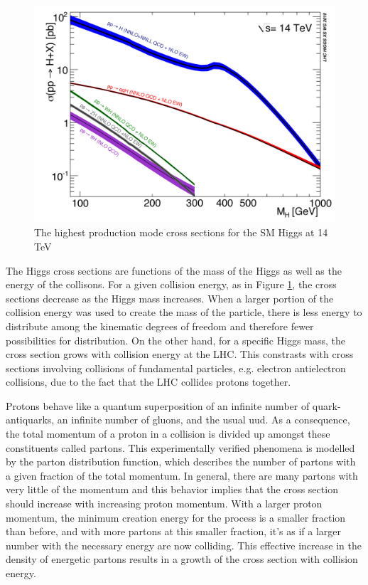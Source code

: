 \begin{figure}[h!]
  \centering
  \includegraphics[width=5in]{images/14TeV_higgs_cross_sections.png}
  \caption
   {The highest production mode cross sections for the SM Higgs at 14 TeV \cite{crossbranchplots}}
  \label{fig:hprodcross}
\end{figure}

The Higgs cross sections are functions of the mass of the Higgs as well as the energy of the collisons. For a given collision energy, as in Figure \ref{fig:hprodcross}, the cross sections decrease as the Higgs mass increases. When a larger portion of the collision energy was used to create the mass of the particle, there is less energy to distribute among the kinematic degrees of freedom and therefore fewer possibilities for distribution. On the other hand, for a specific Higgs mass, the cross section grows with collision energy at the LHC. This constrasts with cross sections involving collisions of fundamental particles, e.g. electron antielectron collisions, due to the fact that the LHC collides protons together. 

Protons behave like a quantum superposition of an infinite number of quark-antiquarks, an infinite number of gluons, and the usual uud. As a consequence, the total momentum of a proton in a collision is divided up amongst these constituents called partons. This experimentally verified phenomena is modelled by the parton distribution function, which describes the number of partons with a given fraction of the total momentum. In general, there are many partons with very little of the momentum and this behavior implies that the cross section should increase with increasing proton momentum. With a larger proton momentum, the minimum creation energy for the process is a smaller fraction than before, and with more partons at this smaller fraction, it's as if a larger number with the necessary energy are now colliding. This effective increase in the density of energetic partons results in a growth of the cross section with collision energy. 

